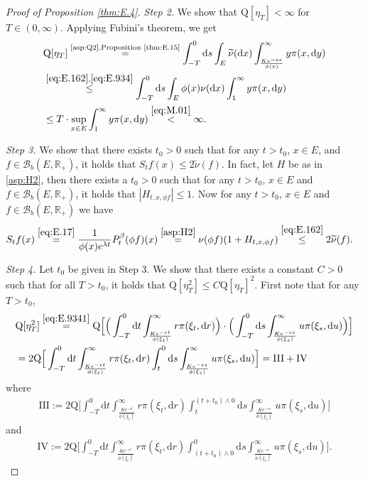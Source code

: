 \documentclass[12pt,a4paper]{amsart}
\numberwithin{equation}{section}
\theoremstyle{plain}
\theoremstyle{definition}
\theoremstyle{remark}
\begin{document}
\begin{proof}[Proof of Proposition \ref{thm:E.4}]
\emph{Step 2.}
	We show that $\mathrm Q[\eta_T]<\infty$ for $T\in (0,\infty)$.
	Applying Fubini's theorem, we get
\begin{align}
	\label{eq:E.9375}&\mathrm Q[\eta_T]
	\overset{\text{\eqref{asp:Q2},Proposition \ref{thm:E.15}}}= \int_{-T}^{0} \mathrm ds \int_E \widetilde \nu(\mathrm dx) \int_{\frac{Ke^{-\epsilon s}}{\phi(x)}}^\infty y\pi(x, \mathrm dy)
	\\& \overset{\eqref{eq:E.162},\eqref{eq:E.934}}\leq \int_{-T}^{0} \mathrm ds \int_E \phi(x)\nu(\mathrm dx) \int_1^\infty y\pi(x, \mathrm dy)
	\\& \leq T \cdot \sup_{x\in E} \int_1^\infty y\pi(x, \mathrm dy)
	\overset{\eqref{eq:M.01}}< \infty.
\end{align}
	
\emph{Step 3.}
	We show that there exists $t_0>0$ such that for any $t>t_0$, $x\in E$, and  $f\in \mathcal B_b(E,\mathbb R_+)$, it holds that $S_tf(x) \leq 2\widetilde\nu( f).$
	In fact, let $H$ be as in \eqref{asp:H2}, then there exists a $t_0>0$ such that for any $t>t_0$, $x\in E$ and $f\in \mathcal B_b(E,\mathbb R_+)$, it holds that $|H_{t,x,\phi f}|\leq 1$.
	Now for any $t>t_0$, $x\in E$ and $f\in \mathcal B_b(E,\mathbb R_+)$ we have
\begin{align}
	&S_tf(x)
	\overset{\eqref{eq:E.17}}= \frac{1}{\phi(x)e^{\lambda t}}P_t^\beta (\phi f) (x)
	\overset{\eqref{asp:H2}}=  \nu(\phi f) (1+ H_{t,x,\phi f})
	\overset{\eqref{eq:E.162}}\leq 2\widetilde \nu(f).
\end{align}

\emph{Step 4.}
	Let $t_0$ be given in Step 3.
	We show that there exists a constant $C>0$ such that for all $T> t_0$, it holds that $\mathrm Q[\eta_T^2]\leq C\mathrm Q[\eta_T]^2$.
	First note that for any $T>t_0$,
\begin{align}
	&\mathrm Q[\eta_T^2]
	\overset{\eqref{eq:E.9341}}=\mathrm Q \Big[\Big(\int_{-T}^0\mathrm dt\int_{\frac{Ke^{-\epsilon t}}{\phi(\xi_t)}}^\infty r \pi(\xi_t, \mathrm dr) \Big)\cdot \Big(\int_{-T}^0\mathrm ds\int_{\frac{Ke^{-\epsilon s}}{\phi(\xi_s)}}^\infty u \pi(\xi_s, \mathrm du)\Big) \Big]
	\\&=2\mathrm Q\Big[ \int_{-T}^0\mathrm dt\int_{\frac{K e^{-\epsilon t}}{\phi(\xi_t)}}^\infty r \pi(\xi_t, \mathrm dr)\int_t^0\mathrm ds
	\int_{\frac{Ke^{-\epsilon s}}{\phi(\xi_s)}}^\infty u \pi(\xi_s, \mathrm du) \Big]
	=\text{III}+\text{IV}
\end{align}
	where
\begin{align}
	\text{III}
	:= 2\mathrm Q\Big[\int_{-T}^0\mathrm dt\int_{\frac{Ke^{-\epsilon t}}{\phi(\xi_t)}}^\infty r \pi(\xi_t, \mathrm dr)\int_t^{(t+t_0)\wedge 0}\mathrm ds\int_{\frac{Ke^{-\epsilon s}}{\phi(\xi_s)}}^\infty u \pi(\xi_s,\mathrm du) \Big]
\end{align}
	and
\begin{align}
	\text{IV}
	:= 2\mathrm Q\Big[\int_{-T}^0\mathrm dt \int_{\frac{Ke^{-\epsilon t}}{\phi(\xi_t)}}^\infty r \pi(\xi_t, \mathrm dr) \int_{(t+t_0)\wedge 0}^0\mathrm ds\int_{\frac{Ke^{-\epsilon s}}{\phi(\xi_s)}}^\infty u \pi(\xi_s, \mathrm du) \Big].
\end{align}
	

\end{proof}
\end{document}
